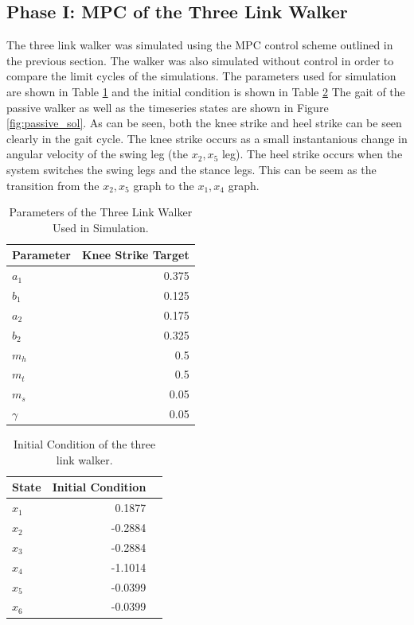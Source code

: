 \documentclass{./springer/svjour3}
\begin{document}
\subsection{Phase I: MPC of the Three Link Walker}

The three link walker was simulated using the MPC control scheme outlined in the previous section. The 
walker was also simulated without control in order to compare the limit cycles of the simulations. The parameters used for simulation are shown in Table
\ref{tab:walker_params} and the initial condition is shown in Table \ref{tab:walker_init}
The gait of the passive walker as well as 
the timeseries states are shown in Figure \ref{fig:passive_sol}. As can be seen, both the knee strike and heel strike can be seen clearly in the gait cycle.
The knee strike occurs as a small instantanious change in angular velocity of the swing leg (the $x_2, x_5$ leg). The heel strike occurs when the system switches the swing legs 
and the stance legs. This can be seem as the transition from the $x_2, x_5$ graph to the $x_1, x_4$ graph.

\begin{table}[h]
  \centering
  \caption{Parameters of the Three Link Walker Used in Simulation.}
  \begin{tabular}{lr}
  \toprule
  Parameter & Knee Strike Target\\
  \midrule
  $a_1$ & 0.375\\
  $b_1$ & 0.125\\
  $a_2$ & 0.175\\
  $b_2$ & 0.325\\
  $m_h$ & 0.5\\
  $m_t$ & 0.5\\
  $m_s$ & 0.05\\
  $\gamma$ & 0.05\\
  \end{tabular}
  \label{tab:walker_params}
\end{table}

\begin{table}[h]
  \centering
  \caption{Initial Condition of the three link walker.}
  \begin{tabular}{lrr}
  \toprule
  State & Initial Condition\\
  \midrule
  $x_{1}$ & 0.1877 \\
  $x_{2}$ & -0.2884\\
  $x_{3}$ & -0.2884\\
  $x_{4}$ & -1.1014\\
  $x_{5}$ & -0.0399\\
  $x_{6}$ & -0.0399\\
  \end{tabular}
  \label{tab:walker_init}
\end{table}
\end{document}
